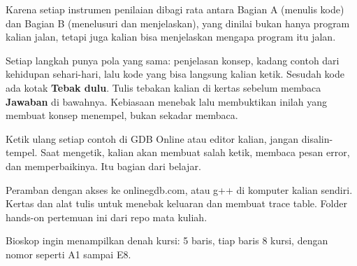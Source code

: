 \documentclass[a4paper]{article}
\begin{document}
\par\vspace{4pt}\par\vspace{6pt}
Karena setiap instrumen penilaian dibagi rata antara Bagian A (menulis kode) dan Bagian B (menelusuri dan menjelaskan), yang dinilai bukan hanya program kalian jalan, tetapi juga kalian bisa menjelaskan mengapa program itu jalan.

Setiap langkah punya pola yang sama: penjelasan konsep, kadang contoh dari kehidupan sehari-hari, lalu kode yang bisa langsung kalian ketik. Sesudah kode ada kotak \textbf{Tebak dulu}. Tulis tebakan kalian di kertas sebelum membaca \textbf{Jawaban} di bawahnya. Kebiasaan menebak lalu membuktikan inilah yang membuat konsep menempel, bukan sekadar membaca.

\begin{Penting}
Ketik ulang setiap contoh di GDB Online atau editor kalian, jangan disalin-tempel. Saat mengetik, kalian akan membuat salah ketik, membaca pesan error, dan memperbaikinya. Itu bagian dari belajar.
\end{Penting}
Peramban dengan akses ke onlinegdb.com, atau g++ di komputer kalian sendiri. Kertas dan alat tulis untuk menebak keluaran dan membuat trace table. Folder hands-on pertemuan ini dari repo mata kuliah.

Bioskop ingin menampilkan denah kursi: 5 baris, tiap baris 8 kursi, dengan nomor seperti A1 sampai E8.
\end{document}
